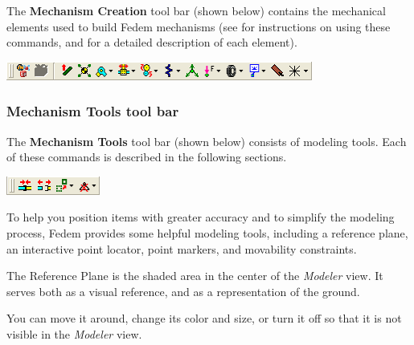
The \textbf{Mechanism Creation} tool bar (shown below) contains the mechanical
elements used to build Fedem mechanisms (see
for instructions on using these commands, and
for a detailed description of each element).

\begin{center}
  \includegraphics[height=1.5\baselineskip]{Figures/3-MechCreateToolbar}
\end{center}


\subsubsection {Mechanism Tools tool bar}

The \textbf{Mechanism Tools} tool bar (shown below) consists of modeling tools.
Each of these commands is described in the following sections.

\begin{center}
  \includegraphics[height=1.5\baselineskip]{Figures/3-MechToolsToolbar}
\end{center}



To help you position items with greater accuracy and to simplify the modeling
process, Fedem provides some helpful modeling tools, including a reference
plane, an interactive point locator, point markers, and movability constraints.



The Reference Plane is the shaded area in the center of the {\sl Modeler} view.
It serves both as a visual reference, and as a representation of the ground.

You can move it around, change its color and size, or turn it off so that it is
not visible in the {\sl Modeler} view.

